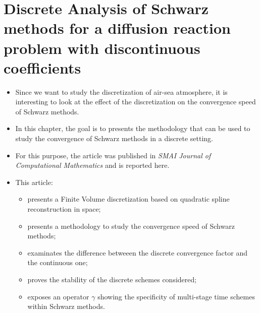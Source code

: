 \chapter{Discrete Analysis of Schwarz methods for a diffusion reaction problem with discontinuous coefficients}
\label{ch:discreteSchwarzAnalysis}
\minitoc
\begin{itemize}
\item Since we want to study the discretization
of air-sea atmosphere, it is interesting to look
at the effect of the discretization on the convergence
speed of Schwarz methods. 
\item In this chapter, the goal is to presents the methodology
that can be used to study the convergence
of Schwarz methods in a discrete setting.
\item For this purpose, the article
\citep{clement_discrete_2022-1} was published in
\textit{SMAI Journal of Computational Mathematics} and is reported
here.
\item This article:
\begin{itemize}
	\item presents a Finite Volume discretization based
	on quadratic spline reconstruction in space;
	\item presents a methodology to study the convergence
	speed of Schwarz methods;
	\item examinates the difference betweeen
	the discrete convergence factor and the continuous one;
	\item proves the stability of the discrete schemes considered;
	\item exposes an operator $\gamma$ showing the specificity
	of multi-stage time schemes within Schwarz methods.
\end{itemize}
\end{itemize}

